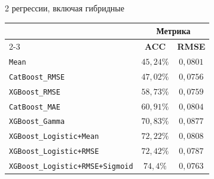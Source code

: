 \begin{multicols}{2}
{{регрессии, включая гибридные}}




{\small

\begin{center}


\begin{tabular}{|l|c|c|}

\hline

& \multicolumn{2}{c|}{\bf Метрика}\\

\cline{2-3}

\multicolumn{1}{|c|}{{\raisebox{6pt}[0pt][0pt]{{\bf Модель}}}} 

 & {\bf ACC}& {\bf RMSE}\\

\hline

\verb"Mean"  &  $45{,}24\%$ &  $0{,}0801$ \\

\verb"CatBoost_RMSE"                 &  $47{,}02\%$ &  $0{,}0756$ \\

\verb"XGBoost_RMSE"                  &  $58{,}73\%$ &  $0{,}0759$ \\

\verb"CatBoost_MAE"                  &  $60{,}91\%$ &  $0{,}0804$ \\

\verb"XGBoost_Gamma"                 &  $70{,}83\%$ &  $0{,}0877$ \\

\verb"XGBoost_Logistic+Mean"         &  $72{,}22\%$ &  $0{,}0808$ \\

\verb"XGBoost_Logistic+RMSE"         &  $72{,}42\%$ &  $0{,}0787$ \\

\verb"XGBoost_Logistic+RMSE+Sigmoid" &  $74{,}4\%$\hphantom{9} &  $0{,}0763$ \\

\hline

\end{tabular}

\end{center}

}





\end{multicols}
